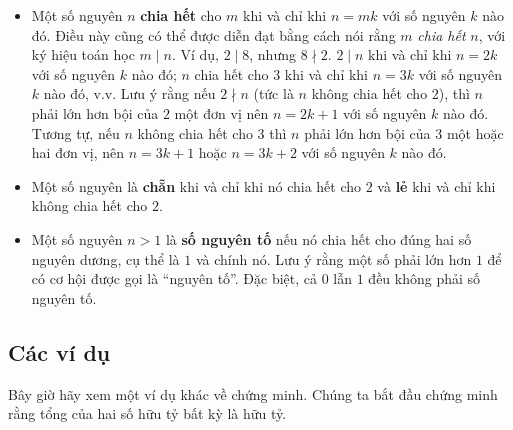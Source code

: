 \begin{itemize}
\item Một số nguyên $n$ \textbf{chia hết} cho $m$ khi và chỉ khi $n = mk$ với số nguyên $k$ nào đó. Điều này cũng có thể được diễn đạt bằng cách nói rằng $m$ \emph{chia hết} $n$, với ký hiệu toán học $m \mid n$. Ví dụ, $2 \mid 8$, nhưng $8 \nmid 2$. $2 \mid n$ khi và chỉ khi $n = 2k$ với số nguyên $k$ nào đó; $n$ chia hết cho $3$ khi và chỉ khi $n = 3k$ với số nguyên $k$ nào đó, v.v. Lưu ý rằng nếu $2 \nmid n$ (tức là $n$ không chia hết cho $2$), thì $n$ phải lớn hơn bội của $2$ một đơn vị nên $n = 2k + 1$ với số nguyên $k$ nào đó. Tương tự, nếu $n$ không chia hết cho $3$ thì $n$ phải lớn hơn bội của $3$ một hoặc hai đơn vị, nên $n = 3k + 1$ hoặc $n = 3k + 2$ với số nguyên $k$ nào đó.

\item Một số nguyên là \textbf{chẵn} khi và chỉ khi nó chia hết cho $2$ và \textbf{lẻ} khi và chỉ khi không chia hết cho $2$.

\item Một số nguyên $n > 1$ là \textbf{số nguyên tố} nếu nó chia hết cho đúng hai số nguyên dương, cụ thể là $1$ và chính nó. Lưu ý rằng một số phải lớn hơn $1$ để có cơ hội được gọi là ``nguyên tố''. Đặc biệt, cả $0$ lẫn $1$ đều không phải số nguyên tố.
\end{itemize}

\subsection{Các ví dụ}

Bây giờ hãy xem một ví dụ khác về chứng minh. Chúng ta bắt đầu chứng minh rằng tổng của hai số hữu tỷ bất kỳ là hữu tỷ.

